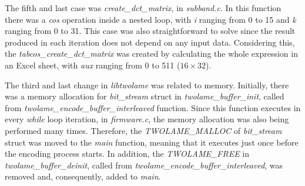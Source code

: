 \documentclass{article}
\begin{document}
\begin{comment}
\begin{figure}[H]
\centerline{\texttt{[image: fft.pdf]}}
\caption{\textit{psycho\_3\_fft} function.}
\label{fft}
\end{figure}

\vspace{1cm}
\end{comment}

The fifth and last case was \textit{create\_dct\_matrix}, in \textit{subband.c}. In this function there was a \textit{cos} operation inside a nested loop, with \textit{i} ranging from 0 to 15 and \textit{k} ranging from 0 to 31. This case was also straightforward to solve since the result produced in each iteration does not depend on any input data. Considering this, the \textit{tabcos\_create\_dct\_matrix} was created by calculating the whole expression in an Excel sheet, with \textit{aux} ranging from 0 to 511 ($16 \times 32$).

\begin{comment}
\begin{figure}[H]
\centerline{\fbox{\texttt{[image: dct.pdf]}}}
\caption{\textit{create\_dct\_matrix} function.}
\label{dct}
\end{figure}

\vspace{1cm}
\end{comment}

The third and last change in \textit{libtwolame} was related to memory.
Initially, there was a memory allocation for \textit{bit\_stream} struct in \textit{twolame\_buffer\_init}, called from \textit{twolame\_encode\_buffer\_interleaved} function. Since this function executes in every \textit{while} loop iteration, in \textit{firmware.c}, the memory allocation was also being performed many times.
Therefore, the \textit{TWOLAME\_MALLOC} of \textit{bit\_stream} struct was moved to the \textit{main} function, meaning that it executes just once before the encoding process starts.
In addition, the \textit{TWOLAME\_FREE} in \textit{twolame\_buffer\_deinit}, called from \textit{twolame\_encode\_buffer\_interleaved}, was removed and, consequently, added to \textit{main}.


\end{document}
